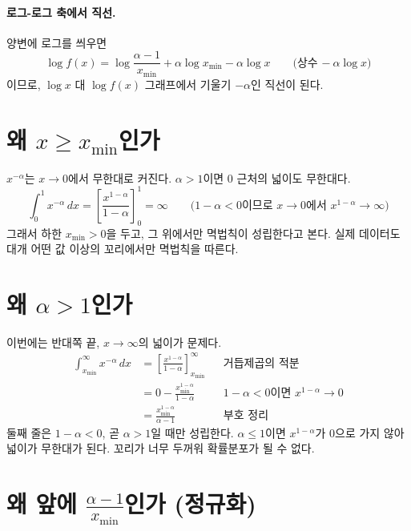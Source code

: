 \documentclass[11pt]{article}
\begin{document}
\paragraph{로그-로그 축에서 직선.}
양변에 로그를 씌우면
\[
  \log f(x) = \log\frac{\alpha-1}{x_{\min}} + \alpha \log x_{\min} - \alpha \log x
  \qquad \text{(상수 $-\ \alpha \log x$)}
\]
이므로, $\log x$ 대 $\log f(x)$ 그래프에서 기울기 $-\alpha$인 직선이 된다.

\section{왜 $x \ge x_{\min}$인가}
\label{sec:xmin}

$x^{-\alpha}$는 $x \to 0$에서 무한대로 커진다. $\alpha > 1$이면 $0$ 근처의 넓이도
무한대다.
\[
  \int_{0}^{1} x^{-\alpha}\,dx = \left[\frac{x^{1-\alpha}}{1-\alpha}\right]_{0}^{1} = \infty
  \qquad \text{($1-\alpha < 0$이므로 $x \to 0$에서 $x^{1-\alpha} \to \infty$)}
\]
그래서 하한 $x_{\min} > 0$을 두고, 그 위에서만 멱법칙이 성립한다고 본다.
실제 데이터도 대개 어떤 값 이상의 꼬리에서만 멱법칙을 따른다.

\section{왜 $\alpha > 1$인가}
\label{sec:alpha}

이번에는 반대쪽 끝, $x \to \infty$의 넓이가 문제다.
\begin{align*}
  \int_{x_{\min}}^{\infty} x^{-\alpha}\,dx
    &= \left[\frac{x^{1-\alpha}}{1-\alpha}\right]_{x_{\min}}^{\infty}
    && \text{거듭제곱의 적분}\\
    &= 0 - \frac{x_{\min}^{1-\alpha}}{1-\alpha}
    && \text{$1-\alpha<0$이면 $x^{1-\alpha} \to 0$}\\
    &= \frac{x_{\min}^{1-\alpha}}{\alpha-1}
    && \text{부호 정리}
\end{align*}
둘째 줄은 $1 - \alpha < 0$, 곧 $\alpha > 1$일 때만 성립한다. $\alpha \le 1$이면
$x^{1-\alpha}$가 $0$으로 가지 않아 넓이가 무한대가 된다. 꼬리가 너무 두꺼워
확률분포가 될 수 없다.

\section{왜 앞에 $\frac{\alpha-1}{x_{\min}}$인가 (정규화)}
\label{sec:normalize}
\end{document}
